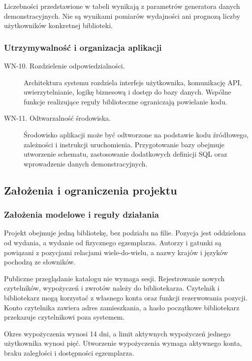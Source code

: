 \documentclass[11pt, a4paper]{article}
\begin{document}
Liczebności przedstawione w tabeli wynikają z parametrów generatora danych demonstracyjnych. Nie są wynikami pomiarów wydajności ani prognozą liczby użytkowników konkretnej biblioteki.

\subsubsection{Utrzymywalność i organizacja aplikacji}

\begin{description}
\item[WN-10. Rozdzielenie odpowiedzialności.] Architektura systemu rozdziela interfejs użytkownika, komunikację API, uwierzytelnianie, logikę biznesową i dostęp do bazy danych. Wspólne funkcje realizujące reguły biblioteczne ograniczają powielanie kodu.
\item[WN-11. Odtwarzalność środowiska.] Środowisko aplikacji może być odtworzone na podstawie kodu źródłowego, zależności i instrukcji uruchomienia. Przygotowanie bazy obejmuje utworzenie schematu, zastosowanie dodatkowych definicji SQL oraz wprowadzenie danych demonstracyjnych.
\end{description}

\subsection{Założenia i ograniczenia projektu}
\label{subsec:zalozenia-ograniczenia}

\subsubsection{Założenia modelowe i reguły działania}

Projekt obejmuje jedną bibliotekę, bez podziału na filie. Pozycja jest oddzielona od wydania, a wydanie od fizycznego egzemplarza. Autorzy i gatunki są powiązani z pozycjami relacjami wiele-do-wielu, a nazwy krajów i języków pochodzą ze słowników.

Publiczne przeglądanie katalogu nie wymaga sesji. Rejestrowanie nowych czytelników, wypożyczeń i zwrotów należy do bibliotekarza. Czytelnik i bibliotekarz mogą korzystać z własnego konta oraz funkcji rezerwowania pozycji. Konto czytelnika zawiera adres zamieszkania, a hasło początkowe bibliotekarz przekazuje czytelnikowi poza systemem.

Okres wypożyczenia wynosi 14 dni, a limit aktywnych wypożyczeń jednego użytkownika wynosi pięć. Utworzenie wypożyczenia wymaga aktywnego konta, braku zaległości i dostępności egzemplarza.
\end{document}
